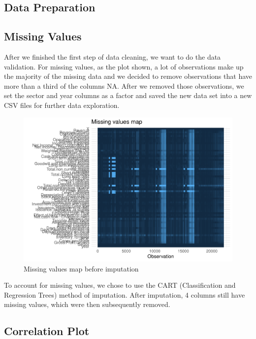 \documentclass[11pt,]{article}
\begin{document}
\hypertarget{data-preparation}{%
\subsection{Data Preparation}\label{data-preparation}}

\hypertarget{missing-values}{%
\subsection{Missing Values}\label{missing-values}}

After we finished the first step of data cleaning, we want to do the
data validation. For missing values, as the plot shown, a lot of
observations make up the majority of the missing data and we decided to
remove observations that have more than a third of the columns NA. After
we removed those observations, we set the sector and year columns as a
factor and saved the new data set into a new CSV files for further data
exploration.

\begin{figure}

{\centering \includegraphics{stock_analysis_files/figure-latex/missing values-1} 

}

\caption{Missing values map before imputation}\label{fig:missing values}
\end{figure}

To account for missing values, we chose to use the CART (Classification
and Regression Trees) method of imputation. After imputation, 4 columns
still have missing values, which were then subsequently removed.

\hypertarget{correlation-plot}{%
\subsection{Correlation Plot}\label{correlation-plot}}
\end{document}
